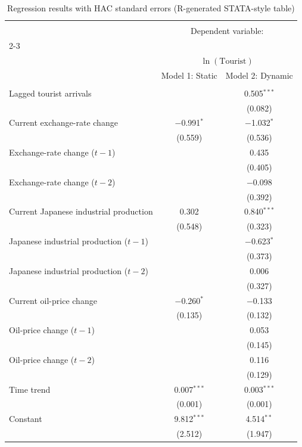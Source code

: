 
\begin{table}[H] \centering 
  \caption{Regression results with HAC standard errors (R-generated STATA-style table)} 
  \label{} 
\small 
\begin{tabular}{@{\extracolsep{5pt}}lcc} 
\\[-1.8ex]\hline 
\hline \\[-1.8ex] 
 & \multicolumn{2}{c}{Dependent variable:} \\ 
\cline{2-3} 
\\[-1.8ex] & \multicolumn{2}{c}{$\ln(\text{Tourist})$} \\ 
 & Model 1: Static & Model 2: Dynamic \\ 
\hline \\[-1.8ex] 
 Lagged tourist arrivals &  & 0.505$^{***}$ \\ 
  &  & (0.082) \\ 
  Current exchange-rate change & $-$0.991$^{*}$ & $-$1.032$^{*}$ \\ 
  & (0.559) & (0.536) \\ 
  Exchange-rate change ($t-1$) &  & 0.435 \\ 
  &  & (0.405) \\ 
  Exchange-rate change ($t-2$) &  & $-$0.098 \\ 
  &  & (0.392) \\ 
  Current Japanese industrial production & 0.302 & 0.840$^{***}$ \\ 
  & (0.548) & (0.323) \\ 
  Japanese industrial production ($t-1$) &  & $-$0.623$^{*}$ \\ 
  &  & (0.373) \\ 
  Japanese industrial production ($t-2$) &  & 0.006 \\ 
  &  & (0.327) \\ 
  Current oil-price change & $-$0.260$^{*}$ & $-$0.133 \\ 
  & (0.135) & (0.132) \\ 
  Oil-price change ($t-1$) &  & 0.053 \\ 
  &  & (0.145) \\ 
  Oil-price change ($t-2$) &  & 0.116 \\ 
  &  & (0.129) \\ 
  Time trend & 0.007$^{***}$ & 0.003$^{***}$ \\ 
  & (0.001) & (0.001) \\ 
  Constant & 9.812$^{***}$ & 4.514$^{**}$ \\ 
  & (2.512) & (1.947) \\ 

\end{tabular}
\end{table}
